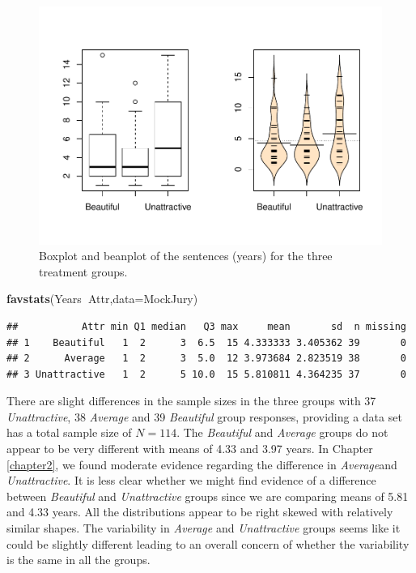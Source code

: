 \documentclass[]{book}
\newenvironment{Shaded}{\begin{snugshade}}{\end{snugshade}}
\newcommand{\KeywordTok}[1]{\textcolor[rgb]{0.13,0.29,0.53}{\textbf{#1}}}
\newcommand{\DataTypeTok}[1]{\textcolor[rgb]{0.13,0.29,0.53}{#1}}
\newcommand{\OperatorTok}[1]{\textcolor[rgb]{0.81,0.36,0.00}{\textbf{#1}}}
\newcommand{\NormalTok}[1]{#1}
\begin{document}
\begin{figure}
\centering
\includegraphics{GreenwoodBanner_files/figure-latex/Figure3-1-1.pdf}
\caption{\label{fig:Figure3-1}Boxplot and beanplot of the sentences (years) for the three
treatment groups.}
\end{figure}

\begin{Shaded}
\begin{Highlighting}[]
\KeywordTok{favstats}\NormalTok{(Years}\OperatorTok{~}\NormalTok{Attr,}\DataTypeTok{data=}\NormalTok{MockJury)}
\end{Highlighting}
\end{Shaded}

\begin{verbatim}
##           Attr min Q1 median   Q3 max     mean       sd  n missing
## 1    Beautiful   1  2      3  6.5  15 4.333333 3.405362 39       0
## 2      Average   1  2      3  5.0  12 3.973684 2.823519 38       0
## 3 Unattractive   1  2      5 10.0  15 5.810811 4.364235 37       0
\end{verbatim}

There are slight differences in the sample sizes in the three groups
with 37 \emph{Unattractive}, 38 \emph{Average} and 39 \emph{Beautiful}
group responses, providing a data set has a total sample size of
\(N=114\). The \emph{Beautiful} and \emph{Average} groups do not appear
to be very different with means of 4.33 and 3.97 years. In Chapter
\ref{chapter2}, we found moderate evidence regarding the difference in
\emph{Average}and \emph{Unattractive}. It is less clear whether we might
find evidence of a difference between \emph{Beautiful} and
\emph{Unattractive} groups since we are comparing means of 5.81 and 4.33
years. All the distributions appear to be right skewed with relatively
similar shapes. The variability in \emph{Average} and
\emph{Unattractive} groups seems like it could be slightly different
leading to an overall concern of whether the variability is the same in
all the groups.
\end{document}
